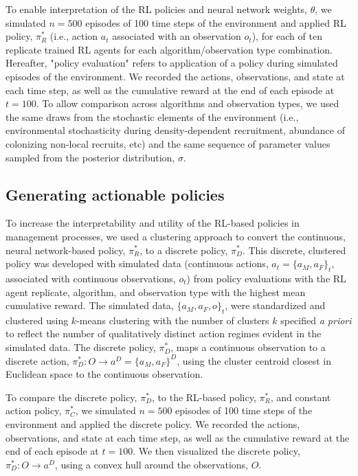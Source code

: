 \documentclass{article}
\begin{document}
To enable interpretation of the RL policies and neural network weights, $\theta$, we simulated $n = 500$ episodes of 100 time steps of the environment and applied RL policy, $\pi^*_R$ (i.e., action $a_t$ associated with an observation $o_t$), for each of ten replicate trained RL agents for each algorithm/observation type combination. Hereafter, "policy evaluation" refers to application of a policy during simulated episodes of the environment. We recorded the actions, observations, and state at each time step, as well as the cumulative reward at the end of each episode at $t = 100$. To allow comparison across algorithms and observation types, we used the same draws from the stochastic elements of the environment (i.e., environmental stochasticity during density-dependent recruitment, abundance of colonizing non-local recruits, etc) and the same sequence of parameter values sampled from the \cite{keller2026integrated} posterior distribution, $\sigma$.

\subsection{Generating actionable policies}

To increase the interpretability and utility of the RL-based policies in management processes, we used a clustering approach to convert the continuous, neural network-based policy, $\pi^*_R$, to a discrete policy, $\pi^*_D$. This discrete, clustered policy was developed with simulated data (continuous actions, $a_t = \{a_M, a_F\}_t$, associated with continuous observations, $o_t$) from policy evaluations with the RL agent replicate, algorithm, and observation type with the highest mean cumulative reward. The simulated data, $\{a_M, a_F, o\}_t$, were standardized and clustered using $k$-means clustering with the number of clusters $k$ specified \textit{a priori} to reflect the number of qualitatively distinct action regimes evident in the simulated data. The discrete policy, $\pi^*_D$, maps a continuous observation to a discrete action, $\pi^*_D: O \rightarrow a^D = \{a_M, a_F\}^D$, using the cluster centroid closest in Euclidean space to the continuous observation.

To compare the discrete policy, $\pi^*_D$, to the RL-based policy, $\pi^*_R$, and constant action policy, $\pi^*_C$, we simulated $n = 500$ episodes of 100 time steps of the environment and applied the discrete policy. We recorded the actions, observations, and state at each time step, as well as the cumulative reward at the end of each episode at $t =100$. We then visualized the discrete policy, $\pi^*_D: O \rightarrow a^D$, using a convex hull around the observations, $O$.
\end{document}
